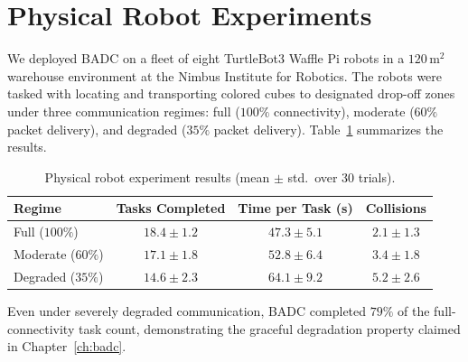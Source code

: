 \section{Physical Robot Experiments}

We deployed BADC on a fleet of eight TurtleBot3 Waffle Pi robots in a $120\,\text{m}^2$
warehouse environment at the Nimbus Institute for Robotics. The robots were
tasked with locating and transporting colored cubes to designated drop-off zones
under three communication regimes: full ($100\%$ connectivity), moderate ($60\%$
packet delivery), and degraded ($35\%$ packet delivery). Table~\ref{tab:physical}
summarizes the results.

\begin{table}[htbp]
\centering
\caption{Physical robot experiment results (mean $\pm$ std.\ over 30 trials).}
\label{tab:physical}
\vspace{4pt}
\begin{tabular}{@{}p{2.5cm} c c c@{}}
\toprule
\color{jhublue}\textbf{Regime} &
\color{jhublue}\textbf{Tasks Completed} &
\color{jhublue}\textbf{Time per Task (s)} &
\color{jhublue}\textbf{Collisions} \\
\midrule
Full ($100\%$)       & $18.4 \pm 1.2$  & $47.3 \pm 5.1$  & $2.1 \pm 1.3$  \\
Moderate ($60\%$)    & $17.1 \pm 1.8$  & $52.8 \pm 6.4$  & $3.4 \pm 1.8$  \\
Degraded ($35\%$)    & $14.6 \pm 2.3$  & $64.1 \pm 9.2$  & $5.2 \pm 2.6$  \\
\bottomrule
\end{tabular}
\vspace{4pt}
\end{table}

Even under severely degraded communication, BADC completed $79\%$ of the
full-connectivity task count, demonstrating the graceful degradation property
claimed in Chapter~\ref{ch:badc}.

